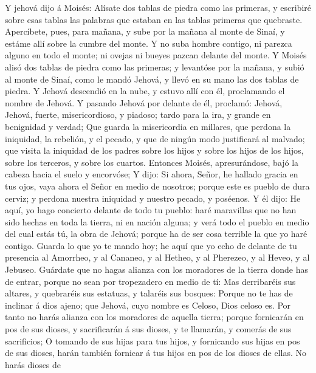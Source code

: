  Y jehová dijo á Moisés: Alísate dos tablas de piedra como
las primeras, y escribiré sobre esas tablas las palabras que estaban en
las tablas primeras que quebraste.  Apercíbete, pues, para
mañana, y sube por la mañana al monte de Sinaí, y estáme allí sobre la
cumbre del monte.  Y no suba hombre contigo, ni parezca
alguno en todo el monte; ni ovejas ni bueyes pazcan delante del monte.
 Y Moisés alisó dos tablas de piedra como las primeras; y
levantóse por la mañana, y subió al monte de Sinaí, como le mandó
Jehová, y llevó en su mano las dos tablas de piedra.  Y
Jehová descendió en la nube, y estuvo allí con él, proclamando el nombre
de Jehová.  Y pasando Jehová por delante de él, proclamó:
Jehová, Jehová, fuerte, misericordioso, y piadoso; tardo para la ira, y
grande en benignidad y verdad;  Que guarda la misericordia
en millares, que perdona la iniquidad, la rebelión, y el pecado, y que
de ningún modo justificará al malvado; que visita la iniquidad de los
padres sobre los hijos y sobre los hijos de los hijos, sobre los
terceros, y sobre los cuartos.  Entonces Moisés,
apresurándose, bajó la cabeza hacia el suelo y encorvóse;  Y
dijo: Si ahora, Señor, he hallado gracia en tus ojos, vaya ahora el
Señor en medio de nosotros; porque este es pueblo de dura cerviz; y
perdona nuestra iniquidad y nuestro pecado, y poséenos.  Y
él dijo: He aquí, yo hago concierto delante de todo tu pueblo: haré
maravillas que no han sido hechas en toda la tierra, ni en nación
alguna; y verá todo el pueblo en medio del cual estás tú, la obra de
Jehová; porque ha de ser cosa terrible la que yo haré contigo.
 Guarda lo que yo te mando hoy; he aquí que yo echo de
delante de tu presencia al Amorrheo, y al Cananeo, y al Hetheo, y al
Pherezeo, y al Heveo, y al Jebuseo.  Guárdate que no hagas
alianza con los moradores de la tierra donde has de entrar, porque no
sean por tropezadero en medio de tí:  Mas derribaréis sus
altares, y quebraréis sus estatuas, y talaréis sus bosques:
 Porque no te has de inclinar á dios ajeno; que Jehová,
cuyo nombre es Celoso, Dios celoso es.  Por tanto no harás
alianza con los moradores de aquella tierra; porque fornicarán en pos de
sus dioses, y sacrificarán á sus dioses, y te llamarán, y comerás de sus
sacrificios;  O tomando de sus hijas para tus hijos, y
fornicando sus hijas en pos de sus dioses, harán también fornicar á tus
hijos en pos de los dioses de ellas.  No harás dioses de
